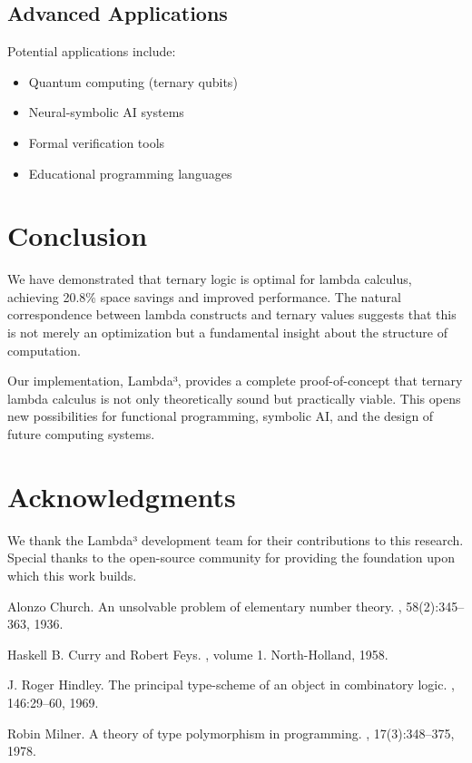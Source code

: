 \documentclass[11pt]{article}
\begin{document}
\subsection{Advanced Applications}

Potential applications include:
\begin{itemize}
    \item Quantum computing (ternary qubits)
    \item Neural-symbolic AI systems
    \item Formal verification tools
    \item Educational programming languages
\end{itemize}

\section{Conclusion}

We have demonstrated that ternary logic is optimal for lambda calculus, achieving 20.8\% space savings and improved performance. The natural correspondence between lambda constructs and ternary values suggests that this is not merely an optimization but a fundamental insight about the structure of computation.

Our implementation, Lambda³, provides a complete proof-of-concept that ternary lambda calculus is not only theoretically sound but practically viable. This opens new possibilities for functional programming, symbolic AI, and the design of future computing systems.

\section{Acknowledgments}

We thank the Lambda³ development team for their contributions to this research. Special thanks to the open-source community for providing the foundation upon which this work builds.


\begin{thebibliography}{9}

Alonzo Church.
\newblock An unsolvable problem of elementary number theory.
, 58(2):345--363, 1936.

Haskell B. Curry and Robert Feys.
, volume 1.
\newblock North-Holland, 1958.

J. Roger Hindley.
\newblock The principal type-scheme of an object in combinatory logic.
, 146:29--60, 1969.

Robin Milner.
\newblock A theory of type polymorphism in programming.
, 17(3):348--375, 1978.

\end{thebibliography}
\end{document}
